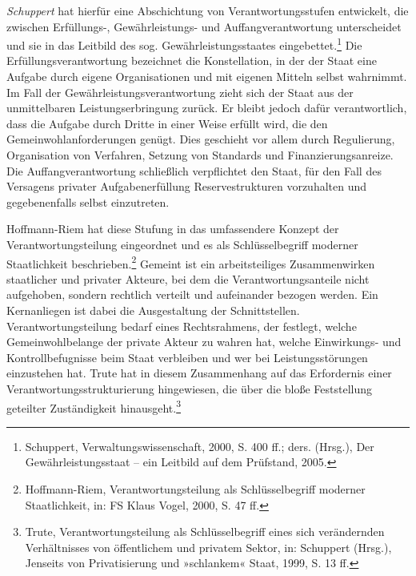 \documentclass[12pt,a4paper,oneside]{book} %
\begin{document}
{	\textit{Schuppert} hat hierfür eine Abschichtung von Verantwortungsstufen entwickelt, die zwischen Erfüllungs-, Gewährleistungs- und Auffangverantwortung unterscheidet und sie in das Leitbild des sog. Gewährleistungsstaates eingebettet.\footnote{Schuppert, Verwaltungswissenschaft, 2000, S. 400 ff.; ders. (Hrsg.), Der Gewährleistungsstaat – ein Leitbild auf dem Prüfstand, 2005.} Die Erfüllungsverantwortung bezeichnet die Konstellation, in der der Staat eine Aufgabe durch eigene Organisationen und mit eigenen Mitteln selbst wahrnimmt. Im Fall der Gewährleistungsverantwortung zieht sich der Staat aus der unmittelbaren Leistungserbringung zurück. Er bleibt jedoch dafür verantwortlich, dass die Aufgabe durch Dritte in einer Weise erfüllt wird, die den Gemeinwohlanforderungen genügt. Dies geschieht vor allem durch Regulierung, Organisation von Verfahren, Setzung von Standards und Finanzierungsanreize. Die Auffangverantwortung schließlich verpflichtet den Staat, für den Fall des Versagens privater Aufgabenerfüllung Reservestrukturen vorzuhalten und gegebenenfalls selbst einzutreten.
	
	Hoffmann-Riem hat diese Stufung in das umfassendere Konzept der Verantwortungsteilung eingeordnet und es als Schlüsselbegriff moderner Staatlichkeit beschrieben.\footnote{Hoffmann-Riem, Verantwortungsteilung als Schlüsselbegriff moderner Staatlichkeit, in: FS Klaus Vogel, 2000, S. 47 ff.} Gemeint ist ein arbeitsteiliges Zusammenwirken staatlicher und privater Akteure, bei dem die Verantwortungsanteile nicht aufgehoben, sondern rechtlich verteilt und aufeinander bezogen werden. Ein Kernanliegen ist dabei die Ausgestaltung der Schnittstellen. Verantwortungsteilung bedarf eines Rechtsrahmens, der festlegt, welche Gemeinwohlbelange der private Akteur zu wahren hat, welche Einwirkungs- und Kontrollbefugnisse beim Staat verbleiben und wer bei Leistungsstörungen einzustehen hat. Trute hat in diesem Zusammenhang auf das Erfordernis einer Verantwortungsstrukturierung hingewiesen, die über die bloße Feststellung geteilter Zuständigkeit hinausgeht.\footnote{Trute, Verantwortungsteilung als Schlüsselbegriff eines sich verändernden Verhältnisses von öffentlichem und privatem Sektor, in: Schuppert (Hrsg.), Jenseits von Privatisierung und »schlankem« Staat, 1999, S. 13 ff.}
	
}
\end{document}
